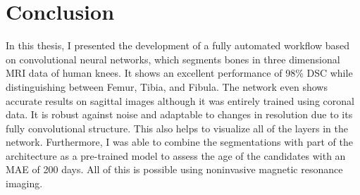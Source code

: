 \section{Conclusion}

In this thesis, I presented the development of a fully automated workflow based on convolutional neural networks, which segments bones in three dimensional MRI data of human knees. It shows an excellent performance of 98\% DSC while distinguishing between Femur, Tibia, and Fibula. The network even shows accurate results on sagittal images although it was entirely trained using coronal data. It is robust against noise and adaptable to changes in resolution due to its fully convolutional structure. This also helps to visualize all of the layers in the network. Furthermore, I was able to combine the segmentations with part of the architecture as a pre-trained model to assess the age of the candidates with an MAE of 200 days. All of this is possible using noninvasive magnetic resonance imaging.

\newpage